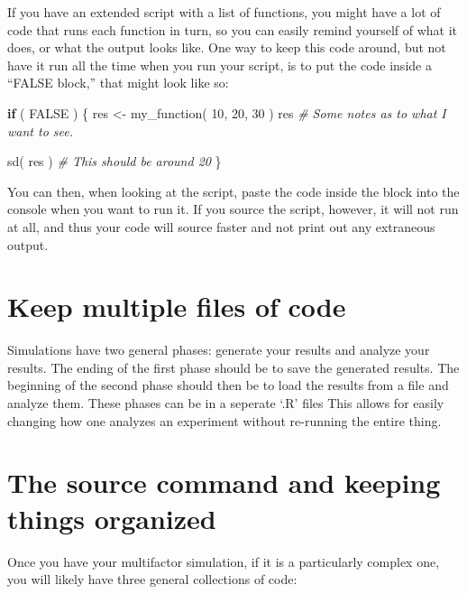 \documentclass[
]{book}
\newenvironment{Shaded}{\begin{snugshade}}{\end{snugshade}}
\newcommand{\CommentTok}[1]{\textcolor[rgb]{0.56,0.35,0.01}{\textit{#1}}}
\newcommand{\ConstantTok}[1]{\textcolor[rgb]{0.00,0.00,0.00}{#1}}
\newcommand{\ControlFlowTok}[1]{\textcolor[rgb]{0.13,0.29,0.53}{\textbf{#1}}}
\newcommand{\DecValTok}[1]{\textcolor[rgb]{0.00,0.00,0.81}{#1}}
\newcommand{\FunctionTok}[1]{\textcolor[rgb]{0.00,0.00,0.00}{#1}}
\newcommand{\NormalTok}[1]{#1}
\newcommand{\OtherTok}[1]{\textcolor[rgb]{0.56,0.35,0.01}{#1}}
\begin{document}
If you have an extended script with a list of functions, you might have a lot of code that runs each function in turn, so you can easily remind yourself of what it does, or what the output looks like.
One way to keep this code around, but not have it run all the time when you run your script, is to put the code inside a ``FALSE block,'' that might look like so:

\begin{Shaded}
\begin{Highlighting}[]
\ControlFlowTok{if}\NormalTok{ ( }\ConstantTok{FALSE}\NormalTok{ ) \{}
\NormalTok{  res }\OtherTok{\textless{}{-}} \FunctionTok{my\_function}\NormalTok{( }\DecValTok{10}\NormalTok{, }\DecValTok{20}\NormalTok{, }\DecValTok{30}\NormalTok{ )}
\NormalTok{  res}
  \CommentTok{\# Some notes as to what I want to see.}
  
  \FunctionTok{sd}\NormalTok{( res )}
  \CommentTok{\# This should be around 20}
\NormalTok{\}}
\end{Highlighting}
\end{Shaded}

You can then, when looking at the script, paste the code inside the block into the console when you want to run it.
If you source the script, however, it will not run at all, and thus your code will source faster and not print out any extraneous output.

\hypertarget{keep-multiple-files-of-code}{%
\section{Keep multiple files of code}\label{keep-multiple-files-of-code}}

Simulations have two general phases: generate your results and analyze your results.
The ending of the first phase should be to save the generated results.
The beginning of the second phase should then be to load the results from a file and analyze them.
These phases can be in a seperate `.R' files
This allows for easily changing how one analyzes an experiment
without re-running the entire thing.

\hypertarget{the-source-command-and-keeping-things-organized}{%
\section{The source command and keeping things organized}\label{the-source-command-and-keeping-things-organized}}

Once you have your multifactor simulation, if it is a particularly complex one, you will likely have three general collections of code:
\end{document}
